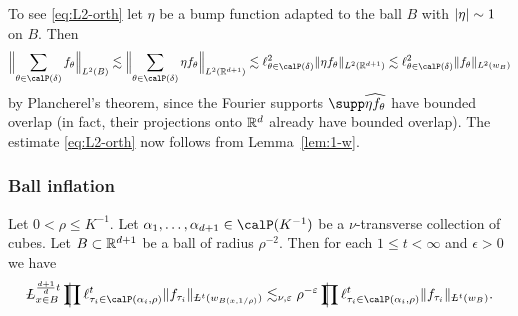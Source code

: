 To see \eqref{eq:L2-orth} let $\eta$ be a bump function adapted to the ball $B$ with $\lvert\eta\rvert \sim 1$ on $B$.
Then
\[
\norm[\Big]{\sum_{\theta\in\Part{\delta}}f_\theta }_{L^2(B)}
\lesssim
\norm[\Big]{\sum_{\theta\in\Part{\delta}} \eta f_\theta }_{L^2(\R^{d+1})}
\lesssim
\ell^{2}_{\theta\in\Part{\delta}}\norm{\eta f_\theta }_{L^2(\R^{d+1})}
\lesssim
\ell^{2}_{\theta\in\Part{\delta}}\norm{f_\theta }_{L^2(w_{B})}
\]
by Plancherel's theorem, since the Fourier supports $\supp \widehat{\eta f_{\theta}}$ have bounded overlap (in fact, their projections onto $\mathbb{R}^{d}$ already have bounded overlap).
The estimate \eqref{eq:L2-orth} now follows from Lemma~\ref{lem:1-w}.

\subsubsection{Ball inflation}\label{sec:ball-inflation}
\begin{lemma}
\label{lem:ball-inflation}
Let $0 < \rho \leq K^{-1}$.
Let $\alpha_1,\dotsc,\alpha_{d+1} \in \Part{K^{-1}}$ be a $\nu$-transverse collection of cubes.
Let $B\subset \mathbb{R}^{d+1}$ be a ball of radius $\rho^{-2}$.
Then for each $1 \leq t < \infty$ and $\epsilon>0$ we have
\begin{equation}\label{eq:ball-inflation:homogeneous}
\avL^{\frac{d+1}{d} t}_{x \in B} \avprod \ell^{t}_{\tau_i \in \Part[\alpha_i]{\rho}} \norm{f_{\tau_i}}_{\avL^{t}(w_{B(x,1/\rho)})}
\lesssim_{\nu,\epsilon} \rho^{-\epsilon}
\avprod \ell^{t}_{\tau_i \in \Part[\alpha_i]{\rho}} \norm{f_{\tau_i}}_{\avL^{t}(w_B)}.
\end{equation}
\end{lemma}

